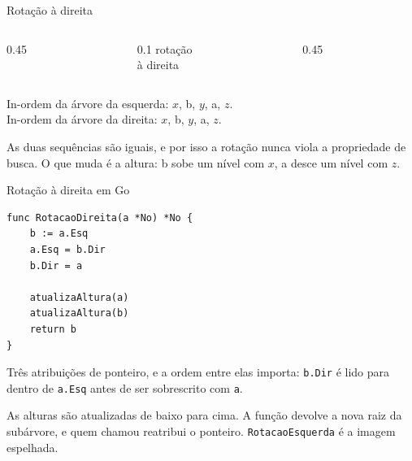 \documentclass{beamer}
\begin{document}
\begin{frame}{Rotação à direita}
  \begin{columns}
    \begin{column}{0.45\textwidth}
      \centering
    \end{column}
    \begin{column}{0.1\textwidth}
      \centering
      \scriptsize rotação\\ à direita
    \end{column}
    \begin{column}{0.45\textwidth}
      \centering
    \end{column}
  \end{columns}

  \vspace{0.5cm}
  In-ordem da árvore da esquerda: $x$, b, $y$, a, $z$.\\
  In-ordem da árvore da direita: $x$, b, $y$, a, $z$.

  \vspace{0.3cm}
  As duas sequências são iguais, e por isso a rotação nunca viola a propriedade
  de busca. O que muda é a altura: b sobe um nível com $x$, a desce um nível
  com $z$.
\end{frame}

\begin{frame}[fragile]{Rotação à direita em Go}
\begin{verbatim}
func RotacaoDireita(a *No) *No {
	b := a.Esq
	a.Esq = b.Dir
	b.Dir = a

	atualizaAltura(a)
	atualizaAltura(b)
	return b
}
\end{verbatim}

  \vspace{0.2cm}
  Três atribuições de ponteiro, e a ordem entre elas importa: \texttt{b.Dir} é
  lido para dentro de \texttt{a.Esq} antes de ser sobrescrito com \texttt{a}.

  \vspace{0.2cm}
  As alturas são atualizadas de baixo para cima. A função devolve a nova raiz da
  subárvore, e quem chamou reatribui o ponteiro.
  \texttt{RotacaoEsquerda} é a imagem espelhada.
\end{frame}
\end{document}
